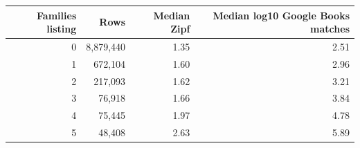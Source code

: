 \begin{tabular}{rrrr}
\toprule
Families listing & Rows & Median Zipf & Median log10 Google Books matches \\
\midrule
0 & 8,879,440 & 1.35 & 2.51 \\
1 & 672,104 & 1.60 & 2.96 \\
2 & 217,093 & 1.62 & 3.21 \\
3 & 76,918 & 1.66 & 3.84 \\
4 & 75,445 & 1.97 & 4.78 \\
5 & 48,408 & 2.63 & 5.89 \\
\bottomrule
\end{tabular}
